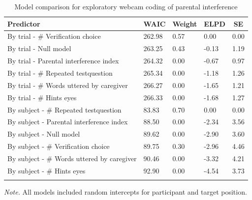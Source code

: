 \documentclass[
  man,floatsintext]{apa6}
\begin{document}
\begin{table}[tbp]

\begin{center}
\begin{threeparttable}

\caption{\label{tab:webcam_table}Model comparison for exploratory webcam coding of parental interference}

\begin{tabular}{lllll}
\toprule
Predictor & \multicolumn{1}{c}{WAIC} & \multicolumn{1}{c}{Weight} & \multicolumn{1}{c}{ELPD} & \multicolumn{1}{c}{SE}\\
\midrule
By trial - \# Verification choice & 262.98 & 0.57 & 0.00 & 0.00\\
By trial - Null model & 263.25 & 0.43 & -0.13 & 1.19\\
By trial - Parental interference index & 264.32 & 0.00 & -0.67 & 0.97\\
By trial - \# Repeated testquestion & 265.34 & 0.00 & -1.18 & 1.26\\
By trial - \# Words uttered by caregiver & 266.27 & 0.00 & -1.65 & 1.21\\
By trial - \# Hints eyes & 266.33 & 0.00 & -1.68 & 1.27\\
By subject - \# Repeated testquestion & 83.83 & 0.70 & 0.00 & 0.00\\
By subject - Parental interference index & 88.50 & 0.00 & -2.34 & 3.56\\
By subject - Null model & 89.62 & 0.00 & -2.90 & 3.60\\
By subject - \# Verification choice & 89.75 & 0.30 & -2.96 & 4.46\\
By subject - \# Words uttered by caregiver & 90.46 & 0.00 & -3.32 & 4.21\\
By subject - \# Hints eyes & 92.90 & 0.00 & -4.54 & 3.73\\
\bottomrule
\addlinespace
\end{tabular}

\begin{tablenotes}[para]
\normalsize{\textit{Note.} All models included random intercepts for participant and target position.}
\end{tablenotes}

\end{threeparttable}
\end{center}

\end{table}

\newpage
\end{document}
